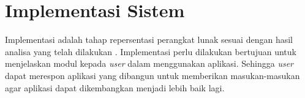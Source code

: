 \section{Implementasi Sistem}
Implementasi adalah tahap repersentasi perangkat lunak sesuai dengan hasil analisa yang telah dilakukan \cite{huda2022implementasi}. Implementasi perlu dilakukan bertujuan untuk menjelaskan modul kepada \textit{user} dalam menggunakan aplikasi. Sehingga \textit{user} dapat merespon aplikasi yang dibangun untuk memberikan masukan-masukan agar aplikasi dapat dikembangkan menjadi lebih baik lagi.

